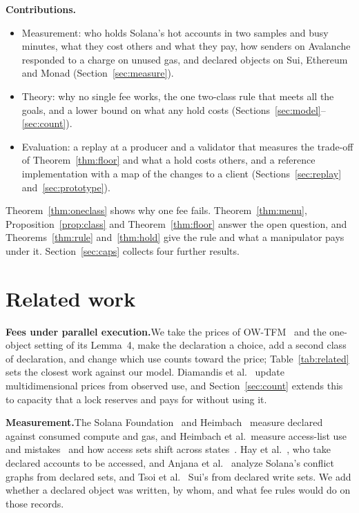 \documentclass[conference,compsoc]{IEEEtran}
\numberwithin{equation}{section}
\theoremstyle{plain}
\theoremstyle{definition}
\theoremstyle{remark}
\newcommand{\runin}[1]{\par\smallskip\noindent\textbf{#1.}\enspace}
\begin{document}
\runin{Contributions}\begin{itemize}
\item Measurement: who holds Solana's hot accounts in two samples and \nPeak{} busy minutes, what they cost others and what they pay, how senders on Avalanche responded to a charge on unused gas, and declared objects on Sui, Ethereum and Monad (Section~\ref{sec:measure}).
\item Theory: why no single fee works, the one two-class rule that meets all the goals, and a lower bound on what any hold costs (Sections~\ref{sec:model}--\ref{sec:count}).
\item Evaluation: a replay at a producer and a validator that measures the trade-off of Theorem~\ref{thm:floor} and what a hold costs others, and a reference implementation with a map of the changes to a client (Sections~\ref{sec:replay} and~\ref{sec:prototype}).
\end{itemize}
Theorem~\ref{thm:oneclass} shows why one fee fails. Theorem~\ref{thm:menu}, Proposition~\ref{prop:class} and Theorem~\ref{thm:floor} answer the open question, and Theorems~\ref{thm:rule} and~\ref{thm:hold} give the rule and what a manipulator pays under it. Section~\ref{sec:caps} collects four further results.

\section{Related work}\label{sec:related}



\runin{Fees under parallel execution}We take the prices of OW-TFM~\cite{wadhwa2026perils} and the one-object setting of its Lemma~4, make the declaration a choice, add a second class of declaration, and change which use counts toward the price; Table~\ref{tab:related} sets the closest work against our model. Diamandis et al.~\cite{diamandis2023designing} update multidimensional prices from observed use, and Section~\ref{sec:count} extends this to capacity that a lock reserves and pays for without using it.

\runin{Measurement}The Solana Foundation~\cite{natale2026resource} and Heimbach~\cite{heimbach2026setting} measure declared against consumed compute and gas, and Heimbach et al.\ measure access-list use and mistakes~\cite{heimbach2025dissecting} and how access sets shift across states~\cite{heimbach2026evm}. Hay et al.~\cite{hay2026analyzing}, who take declared accounts to be accessed, and Anjana et al.~\cite{anjana2025blockchain} analyze Solana's conflict graphs from declared sets, and Tsoi et al.~\cite{tsoi2026not} Sui's from declared write sets. We add whether a declared object was written, by whom, and what fee rules would do on those records.
\end{document}
